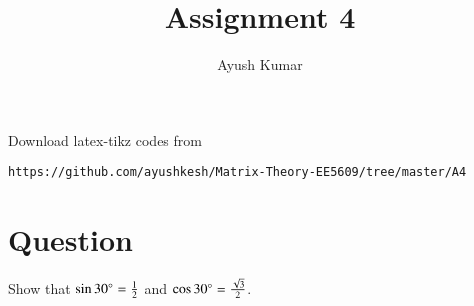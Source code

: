 \documentclass[journal,12pt,twocolumn]{IEEEtran}
\begin{document}
     \def\rightbox#1{\makebox[0in][r]{#1}}
     \def\centbox#1{\makebox[0in]{#1}}
     \def\topbox#1{\raisebox{-\baselineskip}[0in][0in]{#1}}
     \def\midbox#1{\raisebox{-0.5\baselineskip}[0in][0in]{#1}}
\vspace{3cm}
\title{Assignment 4}
\author{Ayush Kumar}
\maketitle
\newpage
\bigskip
\renewcommand{\thefigure}{\theenumi}
\renewcommand{\thetable}{\theenumi}
Download latex-tikz codes from 
%
\begin{lstlisting}
https://github.com/ayushkesh/Matrix-Theory-EE5609/tree/master/A4
\end{lstlisting}

\section{\textbf{Question}}
Show that $\sin30\degree=\frac{1}{2}$ and $\cos30\degree=\frac{\sqrt{3}}{2}$.
\end{document}
